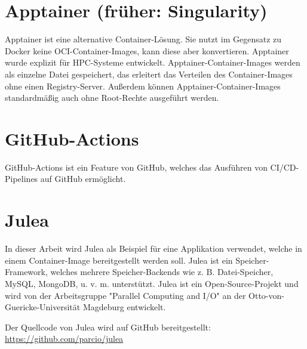 \section{Apptainer (früher: Singularity)}

Apptainer ist eine alternative Container-Lösung. Sie nutzt im Gegensatz zu Docker keine OCI-Container-Images, kann diese aber konvertieren. Apptainer wurde explizit für HPC-Systeme entwickelt. Apptainer-Container-Images werden als einzelne Datei gespeichert, das erleitert das Verteilen des Container-Images ohne einen Registry-Server. Außerdem können Apptainer-Container-Images standardmäßig auch ohne Root-Rechte ausgeführt werden.

\section{GitHub-Actions}

GitHub-Actions ist ein Feature von GitHub, welches das Ausführen von CI/CD-Pipelines auf GitHub ermöglicht.

\section{Julea}

In dieser Arbeit wird Julea als Beispiel für eine Applikation verwendet, welche in einem Container-Image bereitgestellt werden soll. Julea ist ein Speicher-Framework, welches mehrere Speicher-Backends wie z. B. Datei-Speicher, MySQL, MongoDB, u. v. m. unterstützt. Julea ist ein Open-Source-Projekt und wird von der Arbeitsgruppe "Parallel Computing and I/O" an der Otto-von-Guericke-Universität Magdeburg entwickelt.

Der Quellcode von Julea wird auf GitHub bereitgestellt: \url{https://github.com/parcio/julea}
